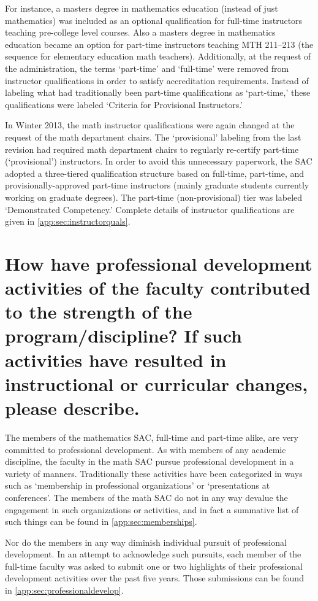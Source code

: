 For instance, a masters degree in mathematics education (instead of just
mathematics) was included as an optional qualification for full-time
instructors teaching pre-college level courses.  Also a masters degree in
mathematics education became an option for part-time instructors teaching MTH
211--213 (the sequence for elementary education math teachers).  Additionally,
at the request of the administration, the terms `part-time' and `full-time'
were removed from instructor qualifications in order to satisfy accreditation
requirements.  Instead of labeling what had traditionally been part-time
qualifications as `part-time,' these qualifications were labeled `Criteria for
Provisional Instructors.'

In Winter 2013, the math instructor qualifications were again changed at the 
request of the math department chairs.  The `provisional' labeling
from the last revision had required math department chairs to regularly
re-certify part-time (`provisional') instructors.  In order to avoid this
unnecessary paperwork, the SAC adopted a three-tiered qualification structure
based on full-time, part-time, and provisionally-approved part-time instructors
(mainly graduate students currently working on graduate degrees).  The
part-time (non-provisional) tier was labeled `Demonstrated Competency.'
Complete details of instructor qualifications are given in \vref{app:sec:instructorquals}.


\section[Professional development activities]{How have professional development activities of the faculty contributed to the strength of the program/discipline? If such activities have resulted in instructional or curricular changes, please describe.}

The members of the mathematics SAC, full-time and part-time alike, are very
committed to professional development.  As with members of any academic
discipline, the faculty in the math SAC pursue professional development in a
variety of manners.  Traditionally these activities have been categorized in
ways such as `membership in professional organizations' or `presentations at
conferences'.  The members of the math SAC do not in any way devalue the
engagement in such organizations or activities, and in fact a summative list of
such things can be found in \vref{app:sec:memberships}.

Nor do the members in any way diminish individual pursuit of professional
development.  In an attempt to acknowledge such pursuits, each member of the
full-time faculty was asked to submit one or two highlights of their
professional development activities over the past five years.  Those
submissions can be found in \vref{app:sec:professionaldevelop}.

